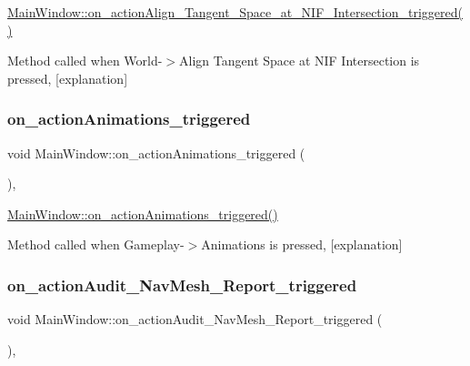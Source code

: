 \hyperlink{class_main_window_a86bd042548f5e84c516b90d6d8b497ef}{Main\+Window\+::on\+\_\+action\+Align\+\_\+\+Tangent\+\_\+\+Space\+\_\+at\+\_\+\+N\+I\+F\+\_\+\+Intersection\+\_\+triggered()} 

Method called when World-\/$>$Align Tangent Space at N\+IF Intersection is pressed, \mbox{[}explanation\mbox{]} \mbox{\label{class_main_window_aab19d695ce2f45f385dae020164106de}} 
\subsubsection{\texorpdfstring{on\+\_\+action\+Animations\+\_\+triggered}{on\_actionAnimations\_triggered}}
{\footnotesize\ttfamily void Main\+Window\+::on\+\_\+action\+Animations\+\_\+triggered (\begin{DoxyParamCaption}{ }\end{DoxyParamCaption})\hspace{0.3cm}{\ttfamily [private]}, {\ttfamily [slot]}}



\hyperlink{class_main_window_aab19d695ce2f45f385dae020164106de}{Main\+Window\+::on\+\_\+action\+Animations\+\_\+triggered()} 

Method called when Gameplay-\/$>$Animations is pressed, \mbox{[}explanation\mbox{]} \mbox{\label{class_main_window_a6baa49b83387847510b49f0e93e0a508}} 
\subsubsection{\texorpdfstring{on\+\_\+action\+Audit\+\_\+\+Nav\+Mesh\+\_\+\+Report\+\_\+triggered}{on\_actionAudit\_NavMesh\_Report\_triggered}}
{\footnotesize\ttfamily void Main\+Window\+::on\+\_\+action\+Audit\+\_\+\+Nav\+Mesh\+\_\+\+Report\+\_\+triggered (\begin{DoxyParamCaption}{ }\end{DoxyParamCaption})\hspace{0.3cm}{\ttfamily [private]}, {\ttfamily [slot]}}



